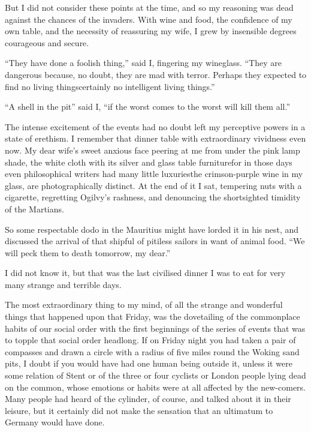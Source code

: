 But I did not consider these points at the time, and so my
reasoning was dead against the chances of the invaders. With wine
and food, the confidence of my own table, and the necessity of
reassuring my wife, I grew by insensible degrees courageous and
secure.

``They have done a foolish thing,'' said I, fingering my wineglass.
``They are dangerous because, no doubt, they are mad with terror.
Perhaps they expected to find no living things\dash{}certainly no
intelligent living things.''

``A shell in the pit'' said I, ``if the worst comes to the worst will
kill them all.''

The intense excitement of the events had no doubt left my
perceptive powers in a state of erethism. I remember that dinner
table with extraordinary vividness even now. My dear wife's sweet
anxious face peering at me from under the pink lamp shade, the
white cloth with its silver and glass table furniture\dash{}for in those
days even philosophical writers had many little luxuries\dash{}the
crimson-purple wine in my glass, are photographically distinct. At
the end of it I sat, tempering nuts with a cigarette, regretting
Ogilvy's rashness, and denouncing the shortsighted timidity of the
Martians.

So some respectable dodo in the Mauritius might have lorded it in
his nest, and discussed the arrival of that shipful of pitiless
sailors in want of animal food. ``We will peck them to death
tomorrow, my dear.''

I did not know it, but that was the last civilised dinner I was to
eat for very many strange and terrible days.

The most extraordinary thing to my mind, of all the strange and
wonderful things that happened upon that Friday, was the
dovetailing of the commonplace habits of our social order with the
first beginnings of the series of events that was to topple that
social order headlong. If on Friday night you had taken a pair of
compasses and drawn a circle with a radius of five miles round the
Woking sand pits, I doubt if you would have had one human being
outside it, unless it were some relation of Stent or of the three
or four cyclists or London people lying dead on the common, whose
emotions or habits were at all affected by the new-comers. Many
people had heard of the cylinder, of course, and talked about it in
their leisure, but it certainly did not make the sensation that an
ultimatum to Germany would have done.

